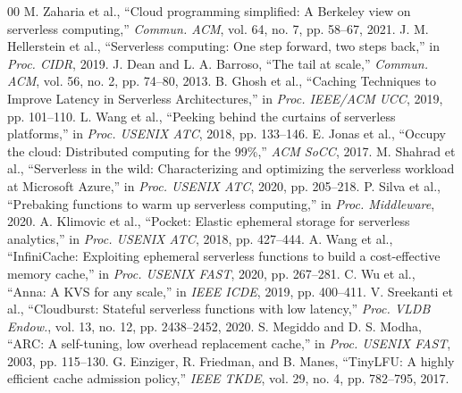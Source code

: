 \documentclass[conference]{IEEEtran}
\begin{document}
\begin{thebibliography}{00}
 M. Zaharia et al., ``Cloud programming simplified: A Berkeley view on serverless computing,'' \textit{Commun. ACM}, vol. 64, no. 7, pp. 58--67, 2021.
 J. M. Hellerstein et al., ``Serverless computing: One step forward, two steps back,'' in \textit{Proc. CIDR}, 2019.
 J. Dean and L. A. Barroso, ``The tail at scale,'' \textit{Commun. ACM}, vol. 56, no. 2, pp. 74--80, 2013.
 B. Ghosh et al., ``Caching Techniques to Improve Latency in Serverless Architectures,'' in \textit{Proc. IEEE/ACM UCC}, 2019, pp. 101--110.
 L. Wang et al., ``Peeking behind the curtains of serverless platforms,'' in \textit{Proc. USENIX ATC}, 2018, pp. 133--146.
 E. Jonas et al., ``Occupy the cloud: Distributed computing for the 99\%,'' \textit{ACM SoCC}, 2017.
 M. Shahrad et al., ``Serverless in the wild: Characterizing and optimizing the serverless workload at Microsoft Azure,'' in \textit{Proc. USENIX ATC}, 2020, pp. 205--218.
 P. Silva et al., ``Prebaking functions to warm up serverless computing,'' in \textit{Proc. Middleware}, 2020.
 A. Klimovic et al., ``Pocket: Elastic ephemeral storage for serverless analytics,'' in \textit{Proc. USENIX ATC}, 2018, pp. 427--444.
 A. Wang et al., ``InfiniCache: Exploiting ephemeral serverless functions to build a cost-effective memory cache,'' in \textit{Proc. USENIX FAST}, 2020, pp. 267--281.
 C. Wu et al., ``Anna: A KVS for any scale,'' in \textit{IEEE ICDE}, 2019, pp. 400--411.
 V. Sreekanti et al., ``Cloudburst: Stateful serverless functions with low latency,'' \textit{Proc. VLDB Endow.}, vol. 13, no. 12, pp. 2438--2452, 2020.
 S. Megiddo and D. S. Modha, ``ARC: A self-tuning, low overhead replacement cache,'' in \textit{Proc. USENIX FAST}, 2003, pp. 115--130.
 G. Einziger, R. Friedman, and B. Manes, ``TinyLFU: A highly efficient cache admission policy,'' \textit{IEEE TKDE}, vol. 29, no. 4, pp. 782--795, 2017.
\end{thebibliography}
\end{document}
